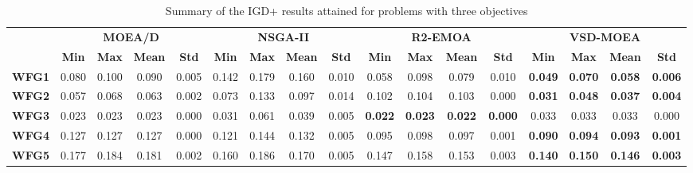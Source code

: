 \begin{table*}[t]
\caption{Summary of the IGD+ results attained for problems with three objectives}
\label{tab:StatisticsIGDP_3obj}
\centering
\begin{tabular}{cc|c|c|c|c|c|c|c|c|c|c|c|c|c|c|c}
\cline{2-17}
\textbf{}                           & \multicolumn{4}{c|}{\textbf{MOEA/D}}                       & \multicolumn{4}{c|}{\textbf{NSGA-II}}                      & \multicolumn{4}{c|}{\textbf{R2-EMOA}}                             & \multicolumn{4}{c}{\textbf{VSD-MOEA}}                            \\ \cline{2-17} 
                                    & \textbf{Min} & \textbf{Max} & \textbf{Mean} & \textbf{Std} & \textbf{Min} & \textbf{Max} & \textbf{Mean} & \textbf{Std} & \textbf{Min}   & \textbf{Max}   & \textbf{Mean}  & \textbf{Std}   & \textbf{Min}   & \textbf{Max}   & \textbf{Mean}  & \textbf{Std}   \\ \hline
\multicolumn{1}{c|}{\textbf{WFG1}}  & 0.080        & 0.100        & 0.090         & 0.005        & 0.142        & 0.179        & 0.160         & 0.010        & 0.058          & 0.098          & 0.079          & 0.010          & \textbf{0.049} & \textbf{0.070} & \textbf{0.058} & \textbf{0.006} \\ \hline
\multicolumn{1}{c|}{\textbf{WFG2}}  & 0.057        & 0.068        & 0.063         & 0.002        & 0.073        & 0.133        & 0.097         & 0.014        & 0.102          & 0.104          & 0.103          & 0.000          & \textbf{0.031} & \textbf{0.048} & \textbf{0.037} & \textbf{0.004} \\ \hline
\multicolumn{1}{c|}{\textbf{WFG3}}  & 0.023        & 0.023        & 0.023         & 0.000        & 0.031        & 0.061        & 0.039         & 0.005        & \textbf{0.022} & \textbf{0.023} & \textbf{0.022} & \textbf{0.000} & 0.033          & 0.033          & 0.033          & 0.000          \\ \hline
\multicolumn{1}{c|}{\textbf{WFG4}}  & 0.127        & 0.127        & 0.127         & 0.000        & 0.121        & 0.144        & 0.132         & 0.005        & 0.095          & 0.098          & 0.097          & 0.001          & \textbf{0.090} & \textbf{0.094} & \textbf{0.093} & \textbf{0.001} \\ \hline
\multicolumn{1}{c|}{\textbf{WFG5}}  & 0.177        & 0.184        & 0.181         & 0.002        & 0.160        & 0.186        & 0.170         & 0.005        & 0.147          & 0.158          & 0.153          & 0.003          & \textbf{0.140} & \textbf{0.150} & \textbf{0.146} & \textbf{0.003} \\ \hline

\end{tabular}
\end{table*}
